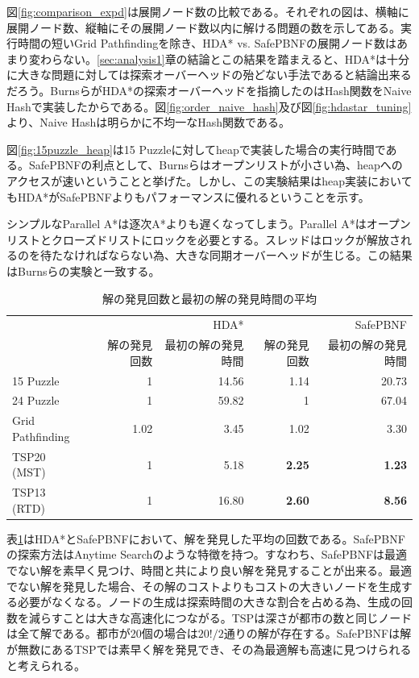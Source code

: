 \documentclass[uplatex]{jsarticle}
\begin{document}
図\ref{fig:comparison_expd}は展開ノード数の比較である。それぞれの図は、横軸に展開ノード数、縦軸にその展開ノード数以内に解ける問題の数を示してある。実行時間の短いGrid Pathfindingを除き、HDA* vs. SafePBNFの展開ノード数はあまり変わらない。\ref{sec:analysis1}章の結論とこの結果を踏まえると、HDA*は十分に大きな問題に対しては探索オーバーヘッドの殆どない手法であると結論出来るだろう。BurnsらがHDA*の探索オーバーヘッドを指摘したのはHash関数をNaive Hashで実装したからである。図\ref{fig:order_naive_hash}及び図\ref{fig:hdastar_tuning}より、Naive Hashは明らかに不均一なHash関数である。
\newline

図\ref{fig:15puzzle_heap}は15 Puzzleに対してheapで実装した場合の実行時間である。SafePBNFの利点として、Burnsらはオープンリストが小さい為、heapへのアクセスが速いということと挙げた\cite{Burns2010}。しかし、この実験結果はheap実装においてもHDA*がSafePBNFよりもパフォーマンスに優れるということを示す。
\newline

シンプルなParallel A*は逐次A*よりも遅くなってしまう。Parallel A*はオープンリストとクローズドリストにロックを必要とする。スレッドはロックが解放されるのを待たなければならない為、大きな同期オーバーヘッドが生じる。この結果はBurnsらの実験と一致する\cite{Burns2010}。
\newline

\begin{table}
	\centering
	\begin{tabular}{lrrrr} \hline
		 & &             HDA* & & SafePBNF \\ 
		 &  解の発見回数 & 最初の解の発見時間 & 解の発見回数 & 最初の解の発見時間 \\ \hline
		15 Puzzle & 1 & 14.56 & 1.14 & 20.73 \\ 
		24 Puzzle & 1 & 59.82 & 1 & 67.04 \\ 
		Grid Pathfinding & 1.02 & 3.45 & 1.02 & 3.30 \\ 
		TSP20　(MST) & 1 & 5.18 & \textbf{2.25} & \textbf{1.23} \\ 
		TSP13　(RTD) & 1 & 16.80 & \textbf{2.60} & \textbf{8.56} \\ \hline
	\end{tabular}
	\caption{解の発見回数と最初の解の発見時間の平均}
	\label{hdastar_incumbent}
\end{table}

表\ref{hdastar_incumbent}はHDA*とSafePBNFにおいて、解を発見した平均の回数である。SafePBNFの探索方法はAnytime Searchのような特徴を持つ\cite{Burns2010}。すなわち、SafePBNFは最適でない解を素早く見つけ、時間と共により良い解を発見することが出来る。最適でない解を発見した場合、その解のコストよりもコストの大きいノードを生成する必要がなくなる。ノードの生成は探索時間の大きな割合を占める為、生成の回数を減らすことは大きな高速化につながる。TSPは深さが都市の数と同じノードは全て解である。都市が20個の場合は$20!/2$通りの解が存在する。SafePBNFは解が無数にあるTSPでは素早く解を発見でき、その為最適解も高速に見つけられると考えられる。
\end{document}
